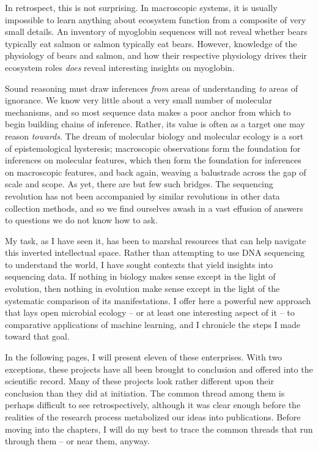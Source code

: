 In retrospect, this is not surprising. In macroscopic systems, it is usually impossible to learn anything about ecosystem function from a composite of very small details. An inventory of myoglobin sequences will not reveal whether bears typically eat salmon or salmon typically eat bears. However, knowledge of the physiology of bears and salmon, and how their respective physiology drives their ecosystem roles {\em does} reveal interesting insights on myoglobin.

Sound reasoning must draw inferences {\em from} areas of understanding {\em to} areas of ignorance. We know very little about a very small number of molecular mechanisms, and so most sequence data makes a poor anchor from which to begin building chains of inference. Rather, its value is often as a target one may reason {\em towards}. The dream of molecular biology and molecular ecology is a sort of epistemological hysteresis; macroscopic observations form the foundation for inferences on molecular features, which then form the foundation for inferences on macroscopic features, and back again, weaving a balustrade across the gap of scale and scope. As yet, there are but few such bridges. The sequencing revolution has not been accompanied by similar revolutions in other data collection methods, and so we find ourselves awash in a vast effusion of answers to questions we do not know how to ask.

My task, as I have seen it, has been to marshal resources that can help navigate this inverted intellectual space. Rather than attempting to use DNA sequencing to understand the world, I have sought contexts that yield insights into sequencing data. If nothing in biology makes sense except in the light of evolution, then nothing in evolution make sense except in the light of the systematic comparison of its manifestations. I offer here a powerful new approach that lays open microbial ecology -- or at least one interesting aspect of it -- to comparative applications of machine learning, and I chronicle the steps I made toward that goal.

In the following pages, I will present eleven of these enterprises. With two exceptions, these projects have all been brought to conclusion and offered into the scientific record. Many of these projects look rather different upon their conclusion than they did at initiation. The common thread among them is perhaps difficult to see retrospectively, although it was clear enough before the realities of the research process metabolized our ideas into publications. Before moving into the chapters, I will do my best to trace the common threads that run through them -- or near them, anyway.

